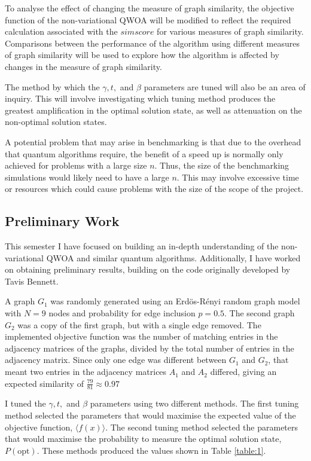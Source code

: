 To analyse the effect of changing the measure of graph similarity, the objective function of the non-variational QWOA will be modified to reflect the required calculation associated with the $simscore$ for various measures of graph similarity. Comparisons between the performance of the algorithm using different measures of graph similarity will be used to explore how the algorithm is affected by changes in the measure of graph similarity.

The method by which the $\gamma, t,$ and $\beta$ parameters are tuned will also be an area of inquiry. This will involve investigating which tuning method produces the greatest amplification in the optimal solution state, as well as attenuation on the non-optimal solution states.

A potential problem that may arise in benchmarking is that due to the overhead that quantum algorithms require, the benefit of a speed up is normally only achieved for problems with a large size $n$. Thus, the size of the benchmarking simulations would likely need to have a large $n$. This may involve excessive time or resources which could cause problems with the size of the scope of the project.
\subsection{Preliminary Work}
This semester I have focused on building an in-depth understanding of the non-variational QWOA and similar quantum algorithms. Additionally, I have worked on obtaining preliminary results, building on the code originally developed by Tavis Bennett. 

A graph $G_{1}$ was randomly generated using an Erdös-Rényi random graph model \cite{erdos_renyi} with $N=9$ nodes and probability for edge inclusion  $p=0.5$. The second graph $G_{2}$ was a copy of the first graph, but with a single edge removed. The implemented objective function was the number of matching entries in the adjacency matrices of the graphs, divided by the total number of entries in the adjacency matrix. Since only one edge was different between $G_{1}$ and $G_{2}$, that meant two entries in the adjacency matrices $A_{1}$ and $A_{2}$ differed, giving an expected similarity of $\frac{79}{81}\approx 0.97$

I tuned the $\gamma, t,$ and $\beta$ parameters using two different methods. The first tuning method selected the parameters that would maximise the expected value of the objective function, $\langle f(x)\rangle$. The second tuning method selected the parameters that would maximise the probability to measure the optimal solution state, $P(\text{opt})$. These methods produced the values shown in Table \ref{table:1}.

